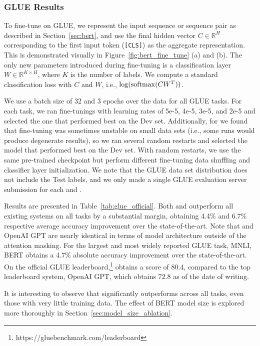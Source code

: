 \subsubsection{GLUE Results}
To fine-tune on GLUE, we represent the input sequence or sequence pair as described in Section~\ref{sec:bert}, and use the final hidden vector $C \in \mathbb{R}^{H}$ corresponding to the first input token ({\tt [CLS]}) as the aggregate representation. This is demonstrated visually in Figure~\ref{fig:bert_fine_tune} (a) and (b). The only new parameters introduced during fine-tuning is a classification layer $W \in \mathbb{R}^{K \times H}$, where $K$ is the number of labels. We compute a standard classification loss with $C$ and $W$, i.e., $\log({\rm softmax}(CW^T))$.

We use a batch size of 32 and 3 epochs over the data for all GLUE tasks. For each task, we ran fine-tunings with learning rates of 5e-5, 4e-5, 3e-5, and 2e-5 and selected the one that performed best on the Dev set. Additionally, for \bertlarge we found that fine-tuning was sometimes unstable on small data sets (i.e., some runs would produce degenerate results), so we ran several random restarts and selected the model that performed best on the Dev set. With random restarts, we use the same pre-trained checkpoint but perform different fine-tuning data shuffling and classifier layer initialization. We note that the GLUE data set distribution does not include the Test labels, and we only made a single GLUE evaluation server submission for each \bertbase and \bertlarge.

Results are presented in Table~\ref{tab:glue_official}. Both \bertbase and \bertlarge outperform all existing systems on all tasks by a substantial margin, obtaining 4.4\% and 6.7\% respective average accuracy improvement over the state-of-the-art. Note that \bertbase and OpenAI GPT are nearly identical in terms of model architecture outside of the attention masking. For the largest and most widely reported GLUE task, MNLI, BERT obtains a 4.7\% absolute accuracy improvement over the state-of-the-art. On the official GLUE leaderboard,\footnote{https://gluebenchmark.com/leaderboard} \bertlarge obtains a score of 80.4, compared to the top leaderboard system, OpenAI GPT, which obtains 72.8 as of the date of writing.

It is interesting to observe that \bertlarge significantly outperforms \bertbase across all tasks, even those with very little training data. The effect of BERT model size is explored more thoroughly in Section~\ref{sec:model_size_ablation}.

